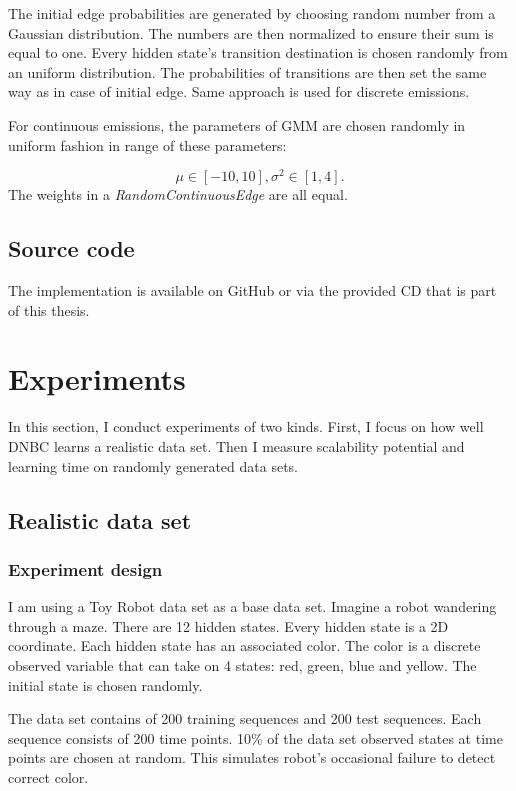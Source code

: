 \documentclass[thesis=B,english]{FITthesis}[2012/06/26]
\begin{document}
The initial edge probabilities are generated by choosing random number from a Gaussian distribution. The numbers are then normalized to ensure their sum is equal to one. Every hidden state's transition destination is chosen randomly from an uniform distribution. The probabilities of transitions are then set the same way as in case of initial edge. Same approach is used for discrete emissions.

For continuous emissions, the parameters of GMM are chosen randomly in uniform fashion in range of these parameters:

\begin{equation*}
\mu \in [-10,10],
\sigma^2 \in [1,4].
\end{equation*}
The weights in a \textit{RandomContinuousEdge} are all equal.

\section{Source code}
The implementation is available on GitHub \cite{dnbc-scala} or via the provided CD that is part of this thesis.

\chapter{Experiments}

In this section, I conduct experiments of two kinds. First, I focus on how well DNBC learns a realistic data set. Then I measure scalability potential and learning time on randomly generated data sets.

\section{Realistic data set}

\subsection{Experiment design}

I am using a Toy Robot data set \cite{robot-maze} as a base data set. Imagine a robot wandering through a maze. There are 12 hidden states. Every hidden state is a 2D coordinate. Each hidden state has an associated color. The color is a discrete observed variable that can take on 4 states: red, green, blue and yellow. The initial state is chosen randomly.

The data set contains of 200 training sequences and 200 test sequences. Each sequence consists of 200 time points. 10\% of the data set observed states at time points are chosen at random. This simulates robot's occasional failure to detect correct color.
\end{document}
